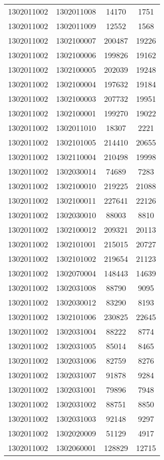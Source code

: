 \begin{longtable}[h]{llcc}
		1302011002 & 1302011008 & 14170 & 1751\\
		1302011002 & 1302011009 & 12552 & 1568\\
		1302011002 & 1302100007 & 200487 & 19226\\
		1302011002 & 1302100006 & 199826 & 19162\\
		1302011002 & 1302100005 & 202039 & 19248\\
		1302011002 & 1302100004 & 197632 & 19184\\
		1302011002 & 1302100003 & 207732 & 19951\\
		1302011002 & 1302100001 & 199270 & 19022\\
		1302011002 & 1302011010 & 18307 & 2221\\
		1302011002 & 1302101005 & 214410 & 20655\\
		1302011002 & 1302110004 & 210498 & 19998\\
		1302011002 & 1302030014 & 74689 & 7283\\
		1302011002 & 1302100010 & 219225 & 21088\\
		1302011002 & 1302100011 & 227641 & 22126\\
		1302011002 & 1302030010 & 88003 & 8810\\
		1302011002 & 1302100012 & 209321 & 20113\\
		1302011002 & 1302101001 & 215015 & 20727\\
		1302011002 & 1302101002 & 219654 & 21123\\
		1302011002 & 1302070004 & 148443 & 14639\\
		1302011002 & 1302031008 & 88790 & 9095\\
		1302011002 & 1302030012 & 83290 & 8193\\
		1302011002 & 1302101006 & 230825 & 22645\\
		1302011002 & 1302031004 & 88222 & 8774\\
		1302011002 & 1302031005 & 85014 & 8465\\
		1302011002 & 1302031006 & 82759 & 8276\\
		1302011002 & 1302031007 & 91878 & 9284\\
		1302011002 & 1302031001 & 79896 & 7948\\
		1302011002 & 1302031002 & 88751 & 8850\\
		1302011002 & 1302031003 & 92148 & 9297\\
		1302011002 & 1302020009 & 51129 & 4917\\
		1302011002 & 1302060001 & 128829 & 12715\\

\end{longtable}
